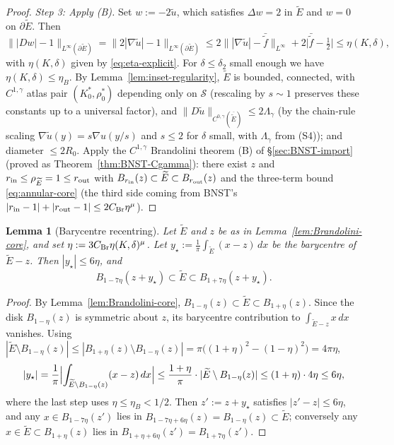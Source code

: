 \documentclass[11pt]{amsart}
\newtheorem{lemma}[theorem]{Lemma}
\newcommand{\Etil}{\widetilde E}
\newcommand{\Sclass}{\mathcal S}
\begin{document}
\begin{proof}
\emph{Step 3: Apply (B).}  Set \(w:=-2\tilde u\), which satisfies
\(\Delta w=2\) in \(\Etil\) and \(w=0\) on \(\partial\Etil\).  Then
\[
   \bigl\||Dw|-1\bigr\|_{L^\infty(\partial\Etil)}
      =\bigl\|2|\nabla\tilde u|-1\bigr\|_{L^\infty(\partial\Etil)}
      \le 2\bigl\||\nabla\tilde u|-\bar{\tilde f}\bigr\|_{L^\infty}
        +2\bigl|\bar{\tilde f}-\tfrac12\bigr|
      \le\eta(K,\delta),
\]
with \(\eta(K,\delta)\) given by \eqref{eq:eta-explicit}.  For
\(\delta\le\delta_2\) small enough we have
$\eta(K,\delta)\le\eta_B$.  By Lemma~\ref{lem:inset-regularity},
$\Etil$ is bounded, connected, with $C^{1,\gamma}$ atlas pair
$(K_0^*,\rho_0^*)$ depending only on $\Sclass$ (rescaling by $s\sim
1$ preserves these constants up to a universal factor), and
$\|D\tilde u\|_{C^{0,\gamma}(\overline{\Etil})}\le 2\Lambda_\gamma$
\textup{(}by the chain-rule scaling
$\nabla\tilde u(y)=s\nabla u(y/s)$ and $s\le 2$ for $\delta$ small,
with $\Lambda_\gamma$ from (S4)\textup{)}; and diameter $\le 2R_0$.
Apply the $C^{1,\gamma}$ Brandolini theorem (B) of
\S\ref{sec:BNST-import} \textup{(}proved as
Theorem~\ref{thm:BNST-Cgamma}\textup{)}: there exist $z$ and
$r_{\rm in}\le\rho_{\Etil}=1\le r_{\rm out}$ with
$B_{r_{\rm in}}(z)\subset\Etil\subset B_{r_{\rm out}}(z)$ and the
three-term bound \eqref{eq:annular-core} (the third side coming
from BNST's $|r_{\rm in}-1|+|r_{\rm out}-1|\le 2C_{\rm Br}\eta^\mu$).
\end{proof}

\begin{lemma}[Barycentre recentring]\label{lem:recenter}
Let \(\Etil\) and \(z\) be as in Lemma~\ref{lem:Brandolini-core}, and
set \(\eta:=3C_{\rm Br}\eta(K,\delta)^\mu\).  Let
\(y_\star:=\frac1\pi\int_{\Etil}(x-z)\,dx\) be the barycentre of
\(\Etil-z\).  Then \(|y_\star|\le 6\eta\), and
\begin{equation}\label{eq:recenter-bound}
   B_{1-7\eta}(z+y_\star)\subset \Etil\subset
      B_{1+7\eta}(z+y_\star).
\end{equation}
\end{lemma}

\begin{proof}
By Lemma~\ref{lem:Brandolini-core}, \(B_{1-\eta}(z)\subset\Etil\subset
B_{1+\eta}(z)\).  Since the disk \(B_{1-\eta}(z)\) is symmetric about
\(z\), its barycentre contribution to \(\int_{\Etil-z}\!x\,dx\)
vanishes.  Using \(|\Etil\setminus B_{1-\eta}(z)|\le|B_{1+\eta}(z)
\setminus B_{1-\eta}(z)|=\pi\bigl((1+\eta)^2-(1-\eta)^2\bigr)=4\pi\eta\),
\[
   |y_\star|=\frac1\pi\Bigl|\int_{\Etil\setminus B_{1-\eta}(z)}
      (x-z)\,dx\Bigr|
      \le\frac{1+\eta}{\pi}\cdot|\Etil\setminus B_{1-\eta}(z)|
      \le(1+\eta)\cdot 4\eta\le 6\eta,
\]
where the last step uses \(\eta\le\eta_B<1/2\).  Then
\(z':=z+y_\star\) satisfies \(|z'-z|\le 6\eta\), and any \(x\in
B_{1-7\eta}(z')\) lies in \(B_{1-7\eta+6\eta}(z)=B_{1-\eta}(z)
\subset\Etil\); conversely any \(x\in\Etil\subset B_{1+\eta}(z)\)
lies in \(B_{1+\eta+6\eta}(z')=B_{1+7\eta}(z')\).
\end{proof}
\end{document}
